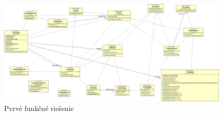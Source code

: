  \begin{figure}[!htbp]
	\centering
	\includegraphics[width=\linewidth]{img/first_attemp_class_diag.jpg}
	\caption{Pvrvé funkčné riešenie}
	\label{fig:test}
\end{figure}
\newline
